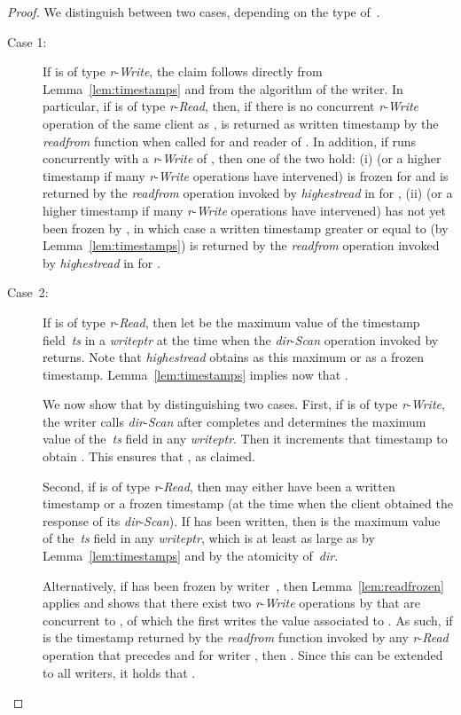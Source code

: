 \documentclass[oribibl]{llncs}
\theoremstyle{definition-boldhead}
\newcommand{\var}[1]{\textit{#1}}
\newcommand{\op}[1]{\textsl{#1}}
\newcommand{\dir}{\var{dir}\xspace}
\begin{document}
\begin{proof}
We distinguish between two cases, depending on the type of~\opr.
\begin{description}
\item[Case 1:]
If \opr is of type \var{r}-\op{Write}, the claim follows directly from
  Lemma~\ref{lem:timestamps} and from the algorithm of the writer.
  In particular, if \popr is of type \var{r}-\op{Read}, then, if there is
  no concurrent \var{r}-\op{Write} operation of the same client  as \opr,
  \tsopr{} is returned as written timestamp by the \var{readfrom} function when
  called for  and reader of \popr.
  In addition, if \popr runs concurrently with a
  \var{r}-\op{Write} of , then one of the two hold:
  (i) \tsopr{} (or a higher timestamp if many \var{r}-\op{Write} operations
  have intervened) is frozen for \popr{} and
  is returned by the \var{readfrom} operation invoked by \var{highestread}
  in \popr for , (ii) \tsopr (or a higher timestamp if many
  \var{r}-\op{Write} operations have intervened) has not yet been frozen
  by , in which case a written timestamp greater or equal to \tsopr
  (by Lemma~\ref{lem:timestamps}) is returned by the \var{readfrom} operation
  invoked by \var{highestread} in \popr for .

\item[Case~2:] If \opr is of type \var{r}-\op{Read}, then let
   be the maximum value of the timestamp field~\var{ts} in
  a \var{writeptr} at the time when the \dir-\op{Scan} operation
  invoked by \opr returns.  Note that \op{highestread} obtains \tsopr
  as this maximum or as a frozen timestamp.
  Lemma~\ref{lem:timestamps} implies now that .

  We now show that  by distinguishing two
  cases.  First, if \popr is of type \var{r}-\op{Write}, the writer
  calls \dir-\op{Scan} after  completes and determines the maximum
  value of the~\var{ts} field in any \var{writeptr}.  Then it
  increments that timestamp to obtain \tspopr.  This ensures that
  , as claimed.

  Second, if \popr is of type \var{r}-\op{Read}, then \tspopr may
  either have been a written timestamp or a frozen timestamp (at the
  time when the client obtained the response of its \dir-\op{Scan}).
  If \tspopr has been written, then \tspopr is the maximum value of
  the~\var{ts} field in any \var{writeptr}, which is at least as large
  as  by Lemma~\ref{lem:timestamps} and by the atomicity
  of~\dir.

  Alternatively, if \tspopr  has been frozen by writer~, then
  Lemma~\ref{lem:readfrozen} applies and shows that there exist two
  \var{r}-\op{Write} operations by  that are  concurrent
  to \popr, of which the first writes the value associated to \tspopr.
As such, if  is the timestamp returned by
  the \var{readfrom} function invoked by any \var{r}-\op{Read} operation \opr
  that precedes \popr{} and for writer , then .
  Since this can be extended to all writers, it holds that .
\end{description}
\end{proof}
\end{document}
